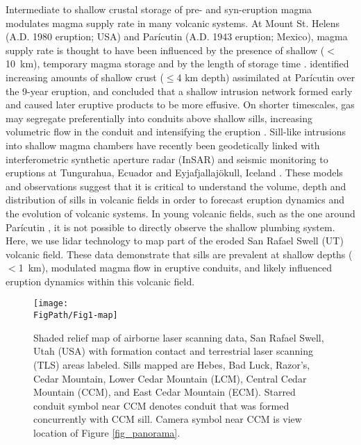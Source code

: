 Intermediate to shallow crustal storage of pre- and syn-eruption magma modulates magma supply rate in many volcanic systems. At Mount St. Helens (A.D. 1980 eruption; USA) and Parícutin (A.D. 1943 eruption; Mexico), magma supply rate is thought to have been influenced by the presence of shallow ($<$10~km), temporary magma storage \citep{cashman2005multiple} and by the length of storage time \citep{scandone2007magma}. \citet{erlund2010compositional} identified increasing amounts of shallow crust ($\le$4 km depth) assimilated at Parícutin over the 9-year eruption, and concluded that a shallow intrusion network formed early and caused later eruptive products to be more effusive. On shorter timescales, gas may segregate preferentially into conduits above shallow sills, increasing volumetric flow in the conduit and intensifying the eruption \citep{conte2000experimental,pioli2009controls}. Sill-like intrusions into shallow magma chambers have recently been geodetically linked with interferometric synthetic aperture radar (InSAR) and seismic monitoring to eruptions at Tungurahua, Ecuador \citep{biggs2010stratovolcano} and Eyjafjallaj\"{o}kull, Iceland \citep{tarasewicz2012magma}. These models and observations suggest that it is critical to understand the volume, depth and distribution of sills in volcanic fields in order to forecast eruption dynamics and the evolution of volcanic systems. In young volcanic fields, such as the one around Parícutin \citep{connor1990cinder}, it is not possible to directly observe the shallow plumbing system. Here, we use lidar technology to map part of the eroded San Rafael Swell (UT) volcanic field. These data demonstrate that sills are prevalent at shallow depths ($<$1~km), modulated magma flow in eruptive conduits, and likely influenced eruption dynamics within this volcanic field.

\begin{figure}
\centering
\texttt{[image: \\FigPath/Fig1-map]}
\caption[Shaded relief map of airborne laser scanning data, San Rafael Swell, Utah (USA).]{Shaded relief map of airborne laser scanning data, San Rafael Swell, Utah (USA) with formation contact and terrestrial laser scanning (TLS) areas labeled. Sills mapped are Hebes, Bad Luck, Razor’s, Cedar Mountain, Lower Cedar Mountain (LCM), Central Cedar Mountain (CCM), and East Cedar Mountain (ECM). Starred conduit symbol near CCM denotes conduit that was formed concurrently with CCM sill. Camera symbol near CCM is view location of Figure \ref{fig_panorama}.}
\label{fig_map}
\end{figure}

